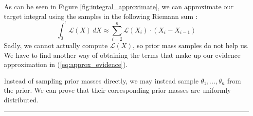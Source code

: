 \documentclass[12pt, a4paper]{report}
\begin{document}
As can be seen in Figure \ref{fig:integral_approximate}, we can approximate our target integral using the samples in the following Riemann sum \cite[p. xvi]{measure_theory}:
\begin{equation}
    \int_0^1 \mathcal{L}(X) \, dX \approx \sum_{i=2}^n \mathcal{L}(X_i) \cdot (X_i - X_{i-1}) \label{eq:approx_evidence}
\end{equation}
Sadly, we cannot actually compute $\mathcal{L}(X)$, so prior mass samples do not help us.
We have to find another way of obtaining the terms that make up our evidence approximation in (\ref{eq:approx_evidence}).

Instead of sampling prior masses directly, we may instead sample $\theta_1, ..., \theta_n$ from the prior.
We can prove that their corresponding prior masses are uniformly distributed.

\FloatBarrier
\hrule \vspace{-0.45cm}
\end{document}
